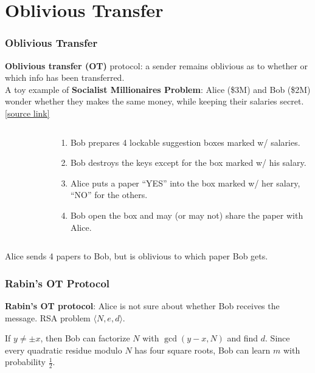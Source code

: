 \section{Oblivious Transfer}
\begin{frame}\frametitle{Oblivious Transfer}
\textbf{Oblivious transfer (OT)} protocol: a sender remains oblivious as to whether or which info has been transferred. \\
\footnotesize A toy example of \textbf{Socialist Millionaires Problem}: Alice (\$3M) and Bob (\$2M) wonder whether they makes the same money, while keeping their salaries secret. \href{http://twistedoakstudios.com/blog/Post3724_explain-it-like-im-five-the-socialist-millionaire-problem-and-secure-multi-party-computation}{\alert{[source link]}}
\begin{columns}
\begin{column}{6cm}
\begin{figure}
\begin{center}

\end{center}
\end{figure}
\end{column}
\begin{column}{6cm}
\footnotesize
\begin{enumerate}
\item Bob prepares 4 lockable suggestion boxes marked w/ salaries.
\item Bob destroys the keys except for the box marked w/ his salary.
\item Alice puts a paper ``YES'' into the box marked w/ her salary, ``NO'' for the others.
\item Bob open the box and may (or may not) share the paper with Alice.
\end{enumerate}
\end{column}
\end{columns}
\alert{Alice sends 4 papers to Bob, but is oblivious to which paper Bob gets.}
\end{frame}
\begin{frame}\frametitle{Rabin's OT Protocol}
\textbf{Rabin's OT protocol}: Alice is not sure about whether Bob receives the message. RSA problem $\langle N, e, d\rangle $.
\begin{figure}
\begin{center}

\end{center}
\end{figure}
If $y \neq \pm x$, then Bob can factorize $N$ with $\gcd(y-x,N)$ and find $d$. Since every quadratic residue modulo $N$ has four square roots, Bob can learn $m$ with probability $\frac{1}{2}$.
\end{frame}

